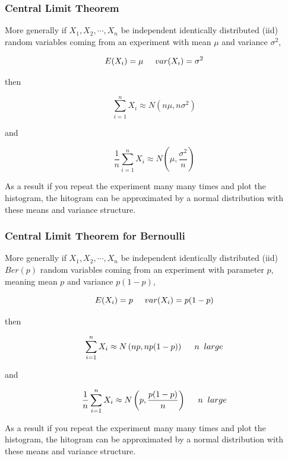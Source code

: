 \documentclass{beamer}\usepackage[]{graphicx}\usepackage[]{color}
\begin{document}
\begin{frame}[fragile]
\frametitle{Central Limit Theorem}

More generally if $X_1, X_2, \cdots, X_n$ be independent identically distributed (iid) random variables coming from an experiment with mean $\mu$ and variance $\sigma^2$, 

$$ E(X_i) = \mu \hspace{0.5 cm} var(X_i) = \sigma^2 $$

then 

$$ \sum_{i=1}^{n} X_{i} \approx N \left (n \mu, n \sigma^2 \right )  $$

and 

$$ \frac{1}{n}\sum_{i=1}^{n} X_{i} \approx N \left (\mu, \frac{\sigma^2}{n} \right ) $$

As a result if you repeat the experiment many many times and plot the histogram, the hitogram can be approximated by a normal distribution with these means and variance structure.

\end{frame}

\begin{frame}[fragile]
\frametitle{Central Limit Theorem for Bernoulli}

More generally if $X_1, X_2, \cdots, X_n$ be independent identically distributed (iid) $Ber(p)$ random variables coming from an experiment with parameter $p$, meaning mean $p$ and variance $p(1-p)$, 

$$ E(X_i) = p \hspace{0.5 cm} var(X_i) = p(1-p) $$

then 

$$ \sum_{i=1}^{n} X_{i} \approx N \left (np, np(1-p) \right ) \hspace{0.5 cm} n \;\; large $$

and 

$$ \frac{1}{n}\sum_{i=1}^{n} X_{i} \approx N \left (p, \frac{p(1-p)}{n} \right )  \hspace{0.5 cm} n \;\; large $$

As a result if you repeat the experiment many many times and plot the histogram, the hitogram can be approximated by a normal distribution with these means and variance structure.

\end{frame}
\end{document}
